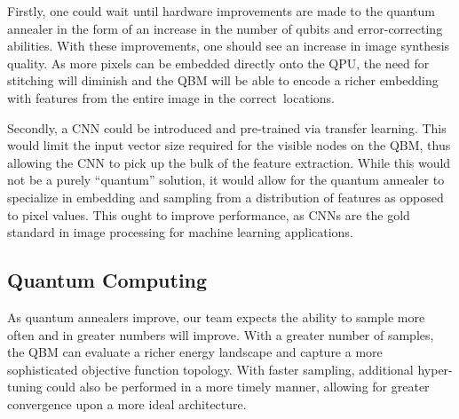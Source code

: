 \documentclass[technologies,article,accept,pdftex,moreauthors]{Definitions/mdpi}
\begin{document}
Firstly, one could wait until hardware improvements are made to the quantum annealer in the form of an increase in the number of qubits and error-correcting abilities. With these improvements, one should see an increase in image synthesis quality. As more pixels can be embedded directly onto the QPU, the need for stitching will diminish and the QBM will be able to encode a richer embedding with features from the entire image in the correct~locations.


Secondly, a CNN could be introduced and pre-trained via transfer learning. This would limit the input vector size required for the visible nodes on the QBM, thus allowing the CNN to pick up the bulk of the feature extraction. While this would not be a purely ``quantum'' solution, it would allow for the quantum annealer to specialize in embedding and sampling from a distribution of features as opposed to pixel values. This ought to improve performance, as CNNs are the gold standard in image processing for machine learning applications.

\subsection{Quantum Computing}
As quantum annealers improve, our team expects the ability to sample more often and in greater numbers will improve. With a greater number of samples, the QBM can evaluate a richer energy landscape and capture a more sophisticated objective function topology. With faster sampling, additional hyper-tuning could also be performed in a more timely manner, allowing for greater convergence upon a more ideal architecture.%

\vspace{6pt}

\authorcontributions{\hl{~~~}}%
\end{document}
